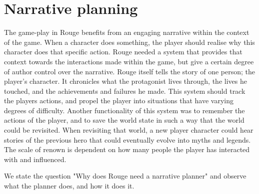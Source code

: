 \chapter{Narrative planning}
\label{ch:planning}
The game-play in Rouge benefits from an engaging narrative within the context of the game. 
When a character does something, the player should realise why this character does that specific action. 
Rouge needed a system that provides that context towards the interactions made within the game, but give a certain degree of author control over the narrative.
Rouge itself tells the story of one person; the player's character.
It chronicles what the protagonist lives through, the lives he touched, and the achievements and failures he made.
This system should track the players actions, and propel the player into situations that have varying degrees of difficulty.
Another functionality of this system was to remember the actions of the player, and to save the world state in such a way that the world could be revisited.
When revisiting that world, a new player character could hear stories of the previous hero that could eventually evolve into myths and legends.
The scale of renown is dependent on how many people the player has interacted with and influenced.

We state the question "Why does Rouge need a narrative planner" and observe what the planner does, and how it does it.

